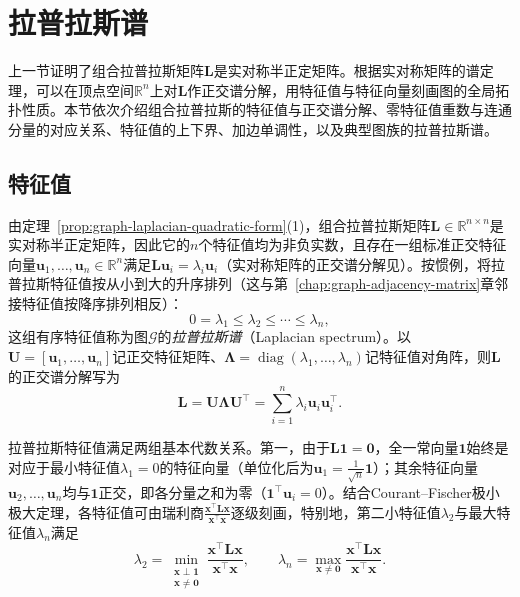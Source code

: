 \section{拉普拉斯谱}
\label{sec:graph-laplacian-eigenvalues}

上一节证明了组合拉普拉斯矩阵$\bm L$是实对称半正定矩阵。根据实对称矩阵的谱定理，可以在顶点空间$\mathbb R^n$上对$\bm L$作正交谱分解，用特征值与特征向量刻画图的全局拓扑性质。本节依次介绍组合拉普拉斯的特征值与正交谱分解、零特征值重数与连通分量的对应关系、特征值的上下界、加边单调性，以及典型图族的拉普拉斯谱。

\subsection{特征值}
\label{sec:graph-laplacian-frequency}

由定理~\ref{prop:graph-laplacian-quadratic-form}(1)，组合拉普拉斯矩阵$\bm L\in\mathbb R^{n\times n}$是实对称半正定矩阵，因此它的$n$个特征值均为非负实数，且存在一组标准正交特征向量$\bm u_1,\ldots,\bm u_n\in\mathbb R^n$满足$\bm L\bm u_i=\lambda_i\bm u_i$（实对称矩阵的正交谱分解见）。按惯例，将拉普拉斯特征值按从小到大的升序排列（这与第~\ref{chap:graph-adjacency-matrix}章邻接特征值按降序排列相反）：
\[
  0=\lambda_1\leq\lambda_2\leq\cdots\leq\lambda_n,
\]
这组有序特征值称为图$\mathcal G$的\emph{拉普拉斯谱}（Laplacian spectrum）。以$\bm U=[\bm u_1,\ldots,\bm u_n]$记正交特征矩阵、$\bm\Lambda=\operatorname{diag}(\lambda_1,\ldots,\lambda_n)$记特征值对角阵，则$\bm L$的正交谱分解写为
\begin{equation}
  \bm L=\bm U\bm\Lambda\bm U^\top=\sum_{i=1}^n\lambda_i\bm u_i\bm u_i^\top.
  \label{eq:graph-laplacian-spectral-energy}
\end{equation}

拉普拉斯特征值满足两组基本代数关系。第一，由于$\bm L\bm 1=\bm 0$，全一常向量$\bm 1$始终是对应于最小特征值$\lambda_1=0$的特征向量（单位化后为$\bm u_1=\frac{1}{\sqrt n}\bm 1$）；其余特征向量$\bm u_2,\ldots,\bm u_n$均与$\bm 1$正交，即各分量之和为零（$\bm 1^\top\bm u_i=0$）。结合Courant--Fischer极小极大定理，各特征值可由瑞利商$\frac{\bm x^\top\bm L\bm x}{\bm x^\top\bm x}$逐级刻画，特别地，第二小特征值$\lambda_2$与最大特征值$\lambda_n$满足
\[
  \lambda_2=\min_{\substack{\bm x\perp\bm 1\\ \bm x\neq\bm 0}}\frac{\bm x^\top\bm L\bm x}{\bm x^\top\bm x},\qquad
  \lambda_n=\max_{\bm x\neq\bm 0}\frac{\bm x^\top\bm L\bm x}{\bm x^\top\bm x}.
\]

